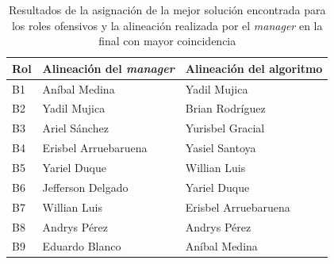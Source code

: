 \begin{table}[H]
	\centering
	\caption{Resultados de la asignación de la mejor solución encontrada para los roles ofensivos y la alineación realizada por el \textit{manager} en la final con mayor coincidencia}\label{table:asignacion-pelota-of}
	\begin{tabular}{l l l }
		\toprule
		\textbf{Rol}          & \textbf{Alineación del \textit{manager}} & \textbf{Alineación del algoritmo} \\ \midrule
		B1                    & Aníbal Medina                            & Yadil Mujica                      \\
		B2                    & Yadil Mujica                             & Brian Rodríguez                   \\
		B3                    & Ariel Sánchez                            & Yurisbel Gracial                  \\
		B4                    & Erisbel Arruebaruena                     & Yasiel Santoya                    \\
		B5                    & Yariel Duque                             & Willian Luis                      \\
		B6  & Jefferson Delgado                        & Yariel Duque                      \\
			B7 & Willian Luis                             & Erisbel Arruebaruena              \\
		\rowcolor{gray!30}	B8 & Andrys Pérez                             & Andrys Pérez                      \\
		B9                    & Eduardo Blanco                           & Aníbal Medina                     \\ \bottomrule
	\end{tabular}
\end{table}
%


